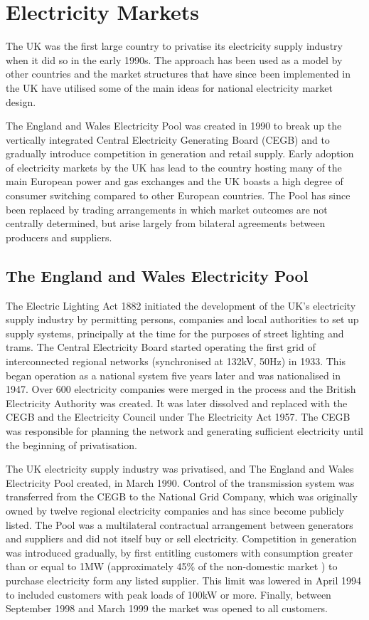 \section{Electricity Markets}
The UK was the first large country to privatise its electricity supply industry
when it did so in the early 1990s.  The approach has been used as a model
by other countries and the market structures that have since been implemented
in the UK have utilised some of the main ideas for national electricity
market design.

The England and Wales Electricity Pool was created in 1990 to break up the
vertically integrated Central Electricity Generating Board (CEGB) and to
gradually introduce competition in generation and retail supply.  Early
adoption of electricity markets by the UK has lead to the country hosting many
of the main European power and gas exchanges and the UK boasts a high degree
of consumer switching compared to other European countries. The Pool has since
been replaced by trading arrangements in which market outcomes are not
centrally determined, but arise largely from bilateral agreements between
producers and suppliers.

\subsection{The England and Wales Electricity Pool}
\label{sec:thepool}
The Electric Lighting Act 1882 initiated the development of the UK's
electricity supply industry by permitting persons, companies and local authorities to set
up supply systems, principally at the time for the purposes of street lighting and
trams.  The Central Electricity Board started operating the first grid of
interconnected regional networks (synchronised at 132kV, 50Hz) in 1933.
This began operation as a national system five years later and was
nationalised in 1947.  Over 600 electricity companies were merged in the
process and the British Electricity Authority was created.  It was later
dissolved and replaced with the CEGB and the Electricity Council under The
Electricity Act 1957.  The CEGB was responsible for planning the network and
generating sufficient electricity until the beginning of privatisation.

The UK electricity supply industry was privatised, and The England and Wales
Electricity Pool created, in March 1990.  Control of the transmission
system was transferred from the CEGB to the National Grid Company, which was
originally owned by twelve regional electricity companies and has since become publicly listed.  The
Pool was a multilateral contractual arrangement between generators and suppliers and did
not itself buy or sell electricity.  Competition in generation was introduced
gradually, by first entitling customers with consumption greater than or equal
to 1MW (approximately 45\% of the non-domestic market \cite{decc:dukes09}) to
purchase electricity form any listed supplier.  This limit was lowered in April
1994 to included customers with peak loads of 100kW or more.  Finally, between
September 1998 and March 1999 the market was opened to all customers.

